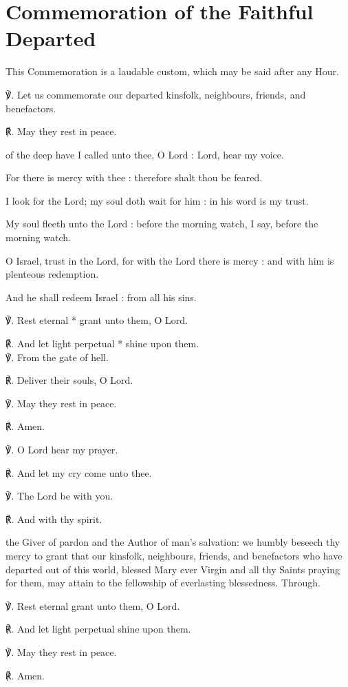 \section{Commemoration of the Faithful Departed}
\fancyhead[RE,LO]{}
\begin{secrubric}
    This Commemoration is a laudable custom, which may be said after any Hour.
\end{secrubric}
\begin{multicols}{2}
℣. Let us commemorate our departed kinsfolk, neighbours, friends, and benefactors.

℟. May they rest in peace.


 of the deep have I called unto thee, O Lord : Lord, hear my voice.\par
{}
For there is mercy with thee : therefore shalt thou be feared.\par
{}I look for the Lord; my soul doth wait for him : in his word is my trust.\par
{}My soul fleeth unto the Lord : before the morning watch, I say, before the morning watch.\par
{}O Israel, trust in the Lord, for with the Lord there is mercy : and with him is plenteous redemption.\par
{}And he shall redeem Israel : from all his sins.\par
℣. Rest eternal * grant unto them, O Lord.\par
℟. And let light perpetual * shine upon them.\\

℣. From the gate of hell.\par
℟. Deliver their souls, O Lord.

℣. May they rest in peace.\par
℟. Amen.

℣. O Lord hear my prayer.\par
℟. And let my cry come unto thee.\par
℣. The Lord be with you.\par
℟. And with thy spirit.\par
{}
{} the Giver of pardon and the Author of man's salvation: we humbly beseech thy mercy to grant that our kinsfolk, neighbours, friends, and benefactors who have departed out of this world, blessed Mary ever Virgin and all thy Saints praying for them, may attain to the fellowship of everlasting blessedness. Through.

℣. Rest eternal grant unto them, O Lord.\par
℟. And let light perpetual shine upon them.\par
℣. May they rest in peace.\par
℟. Amen.
\end{multicols}